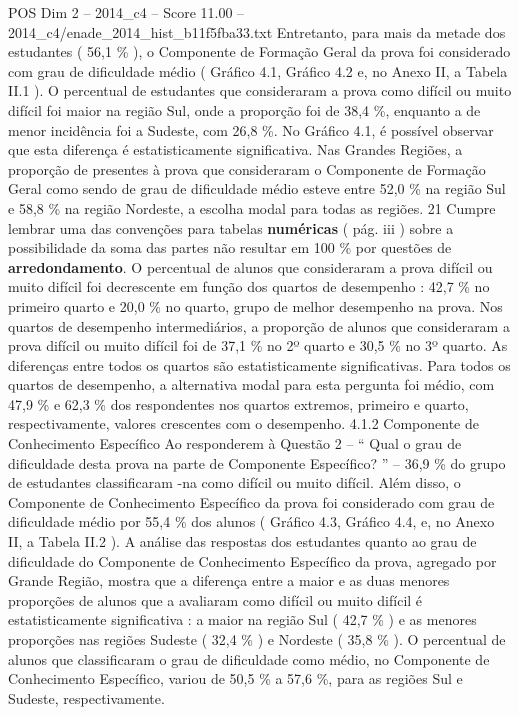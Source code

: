 \begin{textsample}{POS Dim 2 – 2014\_c4 – Score 11.00 – 2014\_c4/enade\_2014\_hist\_b11f5fba33.txt}
Entretanto, para mais da metade dos estudantes ( 56,1 \% ), o Componente de Formação Geral da prova foi considerado com grau de dificuldade médio ( Gráfico 4.1, Gráfico 4.2 e, no Anexo II, a Tabela II.1 ).
O percentual de estudantes que consideraram a prova como difícil ou muito difícil foi maior na região Sul, onde a proporção foi de 38,4 \%, enquanto a de menor incidência foi a Sudeste, com 26,8 \%.
No Gráfico 4.1, é possível observar que esta diferença é estatisticamente significativa.
Nas Grandes Regiões, a proporção de presentes à prova que consideraram o Componente de Formação Geral como sendo de grau de dificuldade médio esteve entre 52,0 \% na região Sul e 58,8 \% na região Nordeste, a escolha modal para todas as regiões. 21 Cumpre lembrar uma das convenções para tabelas \textbf{numéricas} ( pág. iii ) sobre a possibilidade da soma das partes não resultar em 100 \% por questões de \textbf{arredondamento}.
O percentual de alunos que consideraram a prova difícil ou muito difícil foi decrescente em função dos quartos de desempenho : 42,7 \% no primeiro quarto e 20,0 \% no quarto, grupo de melhor desempenho na prova.
Nos quartos de desempenho intermediários, a proporção de alunos que consideraram a prova difícil ou muito difícil foi de 37,1 \% no 2º quarto e 30,5 \% no 3º quarto.
As diferenças entre todos os quartos são estatisticamente significativas.
Para todos os quartos de desempenho, a alternativa modal para esta pergunta foi médio, com 47,9 \% e 62,3 \% dos respondentes nos quartos extremos, primeiro e quarto, respectivamente, valores crescentes com o desempenho. 4.1.2 Componente de Conhecimento Específico Ao responderem à Questão 2 – “ Qual o grau de dificuldade desta prova na parte de Componente Específico? ” – 36,9 \% do grupo de estudantes classificaram -na como difícil ou muito difícil.
Além disso, o Componente de Conhecimento Específico da prova foi considerado com grau de dificuldade médio por 55,4 \% dos alunos ( Gráfico 4.3, Gráfico 4.4, e, no Anexo II, a Tabela II.2 ).
A análise das respostas dos estudantes quanto ao grau de dificuldade do Componente de Conhecimento Específico da prova, agregado por Grande Região, mostra que a diferença entre a maior e as duas menores proporções de alunos que a avaliaram como difícil ou muito difícil é estatisticamente significativa : a maior na região Sul ( 42,7 \% ) e as menores proporções nas regiões Sudeste ( 32,4 \% ) e Nordeste ( 35,8 \% ).
O percentual de alunos que classificaram o grau de dificuldade como médio, no Componente de Conhecimento Específico, variou de 50,5 \% a 57,6 \%, para as regiões Sul e Sudeste, respectivamente.

\end{textsample}
